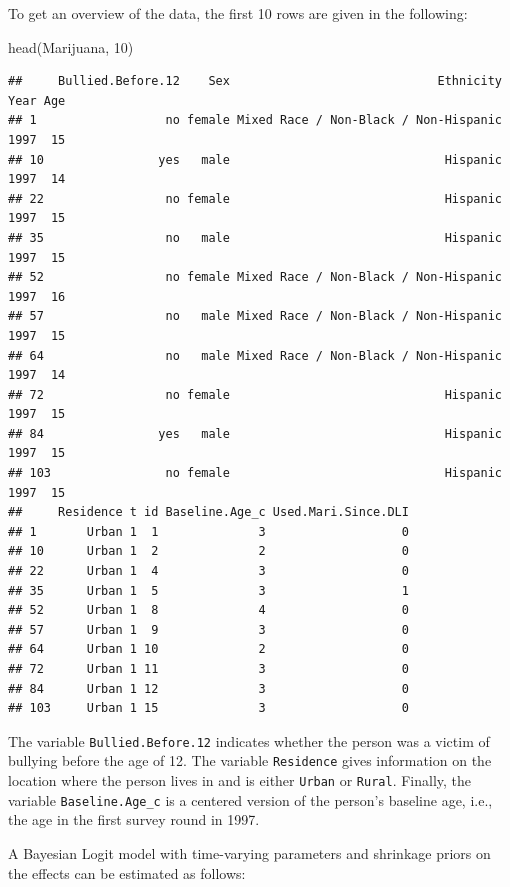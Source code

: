 \documentclass[a4paper, preprint, 3p,
authoryear]{elsarticle} %
\newenvironment{Shaded}{\begin{snugshade}}{\end{snugshade}}
\newcommand{\NormalTok}[1]{#1}
\begin{document}
To get an overview of the data, the first 10 rows are given in the
following:

\begin{Shaded}
\begin{Highlighting}[]
\NormalTok{head(Marijuana, 10)}
\end{Highlighting}
\end{Shaded}

\begin{verbatim}
##     Bullied.Before.12    Sex                             Ethnicity Year Age
## 1                  no female Mixed Race / Non-Black / Non-Hispanic 1997  15
## 10                yes   male                              Hispanic 1997  14
## 22                 no female                              Hispanic 1997  15
## 35                 no   male                              Hispanic 1997  15
## 52                 no female Mixed Race / Non-Black / Non-Hispanic 1997  16
## 57                 no   male Mixed Race / Non-Black / Non-Hispanic 1997  15
## 64                 no   male Mixed Race / Non-Black / Non-Hispanic 1997  14
## 72                 no female                              Hispanic 1997  15
## 84                yes   male                              Hispanic 1997  15
## 103                no female                              Hispanic 1997  15
##     Residence t id Baseline.Age_c Used.Mari.Since.DLI
## 1       Urban 1  1              3                   0
## 10      Urban 1  2              2                   0
## 22      Urban 1  4              3                   0
## 35      Urban 1  5              3                   1
## 52      Urban 1  8              4                   0
## 57      Urban 1  9              3                   0
## 64      Urban 1 10              2                   0
## 72      Urban 1 11              3                   0
## 84      Urban 1 12              3                   0
## 103     Urban 1 15              3                   0
\end{verbatim}

The variable \texttt{Bullied.Before.12} indicates whether the person was
a victim of bullying before the age of 12. The variable
\texttt{Residence} gives information on the location where the person
lives in and is either \texttt{Urban} or \texttt{Rural}. Finally, the
variable \texttt{Baseline.Age\_c} is a centered version of the person's
baseline age, i.e., the age in the first survey round in 1997.

A Bayesian Logit model with time-varying parameters and shrinkage priors
on the effects can be estimated as follows:
\end{document}
